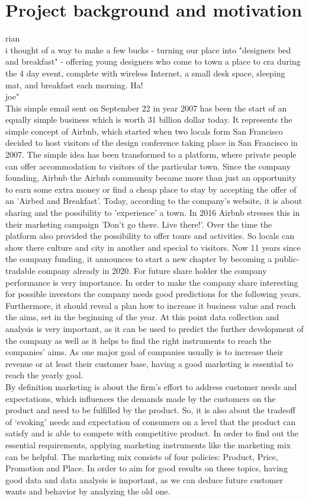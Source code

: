 \documentclass[journal]{IEEEtran}
\begin{document}
\section{Project background and motivation}
 {rian}\\ i thought of a way to make a few bucks - turning our place into "designers bed and breakfast" - offering young designers who come to town a place to cra during the 4 day event, complete with wireless Internet, a small desk space, sleeping mat, and breakfast each morning. Ha! \\ joe"\\
This simple email sent on September 22 in year 2007 has been the start of an equally simple business which is worth 31 billion dollar today. It represents the simple concept of Airbnb, which started when two locals form San Francisco decided to host visitors of the design conference taking place in San Francisco in 2007. The simple idea has been transformed to a platform, where private people can offer accommodation to visitors of the particular town. Since the company founding, Airbnb the Airbnb community became more than just an opportunity to earn some extra money or find a cheap place to stay by accepting the offer of an 'Airbed and Breakfast'. Today, according to the company’s website, it is about sharing and the possibility to 'experience' a town. In 2016 Airbnb stresses this in their marketing campaign 'Don't go there. Live there!'. Over the time the platform also provided the possibility to offer tours and activities. So locals can show there culture and city in another and special to visitors. Now 11 years since the company funding, it announces to start a new chapter by becoming a public-tradable company already in 2020. For future share holder the company performance is very importance. In order to make the company share interesting for possible investors the company needs good predictions for the following years. Furthermore, it should reveal a plan how to increase it business value and reach the aims, set in the beginning of the year. At this point data collection and analysis is very important, as it can be used to predict the further development of the company as well as it helps to find the right instruments to reach the companies' aims. As one major goal of companies usually is to increase their revenue or at least their customer base, having a good marketing is essential to reach the yearly goal.\\
By definition marketing is about the firm’s effort to address customer needs and expectations, which influences the demands made by the customers on the product and need to be fulfilled by the product. So, it is also about the tradeoff of ‘evoking’ needs and expectation of consumers on a level that the product can satisfy and is able to compete with competitive product. In order to find out the essential requirements, applying marketing instruments like the marketing mix can be helpful. The marketing mix consists of four policies: Product, Price, Promotion and Place. In order to aim for good results on these topics, having good data and data analysis is important, as we can deduce future customer wants and behavior by analyzing the old one.\\
\end{document}
